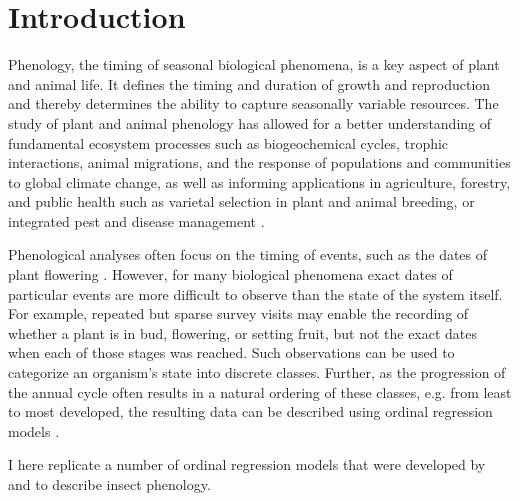 \section{Introduction}

Phenology, the timing of seasonal biological phenomena, is a key aspect of plant and animal life.
It defines the timing and duration of growth and reproduction and thereby determines the ability to capture seasonally variable resources.
The study of plant and animal phenology has allowed for a better understanding of fundamental ecosystem processes such as biogeochemical cycles,
trophic interactions, animal migrations, and the response of populations and communities to global climate change,
as well as informing applications in agriculture, forestry, and public health such as varietal selection in plant and animal breeding, or integrated pest and disease management \citep{chuine2017process}.

Phenological analyses often focus on the timing of events, such as the dates of plant flowering \citep{aono2008phenological}.%
However, for many biological phenomena exact dates of particular events are more difficult to observe than the state of the system itself.
For example, repeated but sparse survey visits may enable the recording of whether a plant is in bud, flowering, or setting fruit, but not the exact dates when each of those stages was reached.
Such observations can be used to categorize an organism's state into discrete classes.
Further, as the progression of the annual cycle often results in a natural ordering of these classes, e.g. from least to most developed, the resulting data can be described using ordinal regression models \cite{mccullagh1980regression,agresti2010analysis}.

I here replicate a number of ordinal regression models that were developed by \citet{dennis1986stochastic} and \citet{candy1991modeling} to describe insect phenology. 

